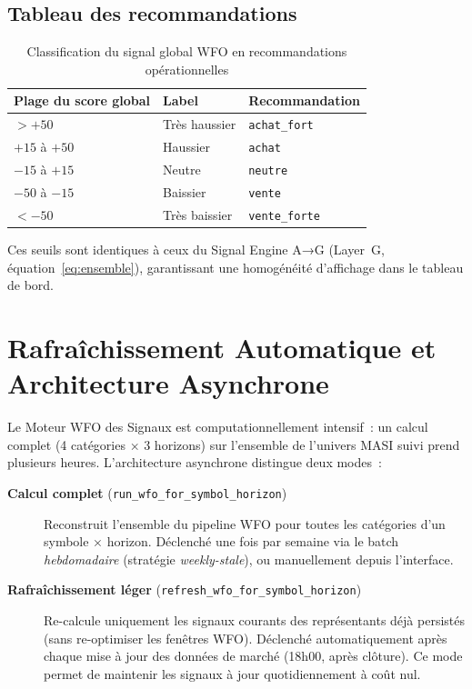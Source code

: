 \subsection{Tableau des recommandations}

\begin{table}[H]
\centering
\caption{Classification du signal global WFO en recommandations opérationnelles}
\label{tab:wfo_labels}
\begin{tabularx}{\linewidth}{@{}lYY@{}}
\toprule
\textbf{Plage du score global} & \textbf{Label} & \textbf{Recommandation} \\
\midrule
$> +50$ & Très haussier & \texttt{achat\_fort} \\
$+15$ à $+50$ & Haussier & \texttt{achat} \\
$-15$ à $+15$ & Neutre & \texttt{neutre} \\
$-50$ à $-15$ & Baissier & \texttt{vente} \\
$< -50$ & Très baissier & \texttt{vente\_forte} \\
\bottomrule
\end{tabularx}
\end{table}

Ces seuils sont identiques à ceux du Signal Engine A→G (Layer~G,
équation~\eqref{eq:ensemble}), garantissant une homogénéité d'affichage
dans le tableau de bord.

\section{Rafraîchissement Automatique et Architecture Asynchrone}
\label{sec:wfo_refresh}

Le Moteur WFO des Signaux est computationnellement intensif~: un calcul complet
(4 catégories × 3 horizons) sur l'ensemble de l'univers MASI suivi prend plusieurs heures.
L'architecture asynchrone distingue deux modes~:

\begin{description}
    \item[\textbf{Calcul complet} (\texttt{run\_wfo\_for\_symbol\_horizon})]
    Reconstruit l'ensemble du pipeline WFO pour toutes les catégories
    d'un symbole × horizon. Déclenché une fois par semaine via le batch
    \textit{hebdomadaire} (stratégie \textit{weekly-stale}), ou manuellement
    depuis l'interface.

    \item[\textbf{Rafraîchissement léger} (\texttt{refresh\_wfo\_for\_symbol\_horizon})]
    Re-calcule uniquement les signaux courants des représentants déjà persistés
    (sans re-optimiser les fenêtres WFO). Déclenché automatiquement après chaque
    mise à jour des données de marché (18h00, après clôture). Ce mode permet de
    maintenir les signaux à jour quotidiennement à coût nul.
\end{description}

